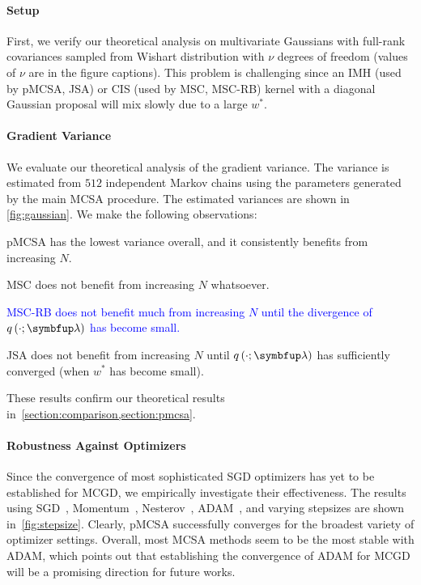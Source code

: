 \paragraph{Setup}
First, we verify our theoretical analysis on multivariate Gaussians with full-rank covariances sampled from Wishart distribution with \(\nu\) degrees of freedom (values of \(\nu\) are in the figure captions).
This problem is challenging since an IMH (used by pMCSA, JSA) or CIS (used by MSC, MSC-RB) kernel with a diagonal Gaussian proposal will mix slowly due to a large \(w^*\).

\vspace{-0.1in}
\paragraph{Gradient Variance}
We evaluate our theoretical analysis of the gradient variance.
The variance is estimated from \(512\) independent Markov chains using the parameters generated by the main MCSA procedure.
The estimated variances are shown in \cref{fig:gaussian}.
We make the following observations:
\begin{enumerate*}[label=\textbf{(\roman*)}]
  \item pMCSA has the lowest variance overall, and it consistently benefits from increasing \(N\).
  \item MSC does not benefit from increasing \(N\) whatsoever.
    
  \item \textcolor{blue}{
    MSC-RB does not benefit much from increasing \(N\) until the divergence of \(q\left(\cdot; \vlambda\right)\) has become small.
    }
  \item JSA does not benefit from increasing \(N\) until \(q\left(\cdot; \vlambda\right)\) has sufficiently converged (when \(w^*\) has become small).
\end{enumerate*}
These results confirm our theoretical results in~\cref{section:comparison,section:pmcsa}.




\vspace{-0.1in}
\paragraph{Robustness Against Optimizers}
Since the convergence of most sophisticated SGD optimizers has yet to be established for MCGD, we empirically investigate their effectiveness.
The results using SGD~\citep{robbins_stochastic_1951, bottou_optimization_2018a}, Momentum~\citep{polyak_methods_1964}, Nesterov~\citep{nesterov_method_1983}, ADAM~\citep{kingma_adam_2015}, and varying stepsizes are shown in~\cref{fig:stepsize}.
Clearly, pMCSA successfully converges for the broadest variety of optimizer settings.
Overall, most MCSA methods seem to be the most stable with ADAM, which points out that establishing the convergence of ADAM for MCGD will be a promising direction for future works.

